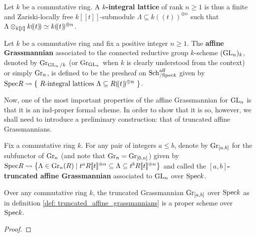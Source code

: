             \begin{definition} \label{def: integral_lattices}
                Let $k$ be a commutative ring. A \textbf{$k$-integral lattice} of rank $n \geq 1$ is thus a finite and Zariski-locally free $k[\![t]\!]$-submodule $\Lambda \subseteq k(\!(t)\!)^{\oplus n}$ such that $\Lambda \tensor_{k[\![t]\!]} k(\!(t)\!) \cong k(\!(t)\!)^{\oplus n}$. 
            \end{definition}
            \begin{definition} \label{def: the_affine_grassmannian_for_GLn}
                Let $k$ be a commutative ring and fix a positive integer $n \geq 1$. The \textbf{affine Grassmannian} associated to the connected reductive group $k$-scheme $(\operatorname{GL}_n)_k$, denoted by $\mathrm{Gr}_{\operatorname{GL}_n/k}$ (or $\mathrm{Gr}_{\operatorname{GL}_n}$ when $k$ is clearly understood from the context) or simply $\mathrm{Gr}_n$, is defined to be the presheaf on $\mathrm{Sch}_{/\mathrm{Spec} k}^{\mathrm{aff}}$ given by $\mathrm{Spec} R \leadsto \left\{ \text{ $R$-integral lattices $\Lambda \subseteq R(\!(t)\!)^{\oplus n}$ } \right\}$.
            \end{definition}
            Now, one of the most important properties of the affine Grassmannian for $\operatorname{GL}_n$ is that it is an ind-proper formal scheme. In order to show that it is so, however, we shall need to introduce a preliminary construction: that of truncated affine Grassmannians. 
            \begin{definition} \label{def: truncated_affine_grassmannians}
                Fix a commutative ring $k$. For any pair of integers $a \leq b$, denote by $\mathrm{Gr}_{[a, b]}$ for the subfunctor of $\mathrm{Gr}_n$ (and note that $\mathrm{Gr}_n = \mathrm{Gr}_{[0, n]}$) given by $\mathrm{Spec} R \leadsto \left\{ \Lambda \in \mathrm{Gr}_n(R) \mid t^a R[\![t]\!]^{\oplus n} \subseteq \Lambda \subseteq t^b R[\![t]\!]^{\oplus n} \right\}$ and called the \textbf{$[a, b]$-truncated affine Grassmannian} associated to $\operatorname{GL}_n$ over $\mathrm{Spec} k$.
            \end{definition}
            \begin{proposition} \label{prop: truncated_grassmannians_are_proper}
                Over any commutative ring $k$, the truncated Grassmannian $\mathrm{Gr}_{[a, b]}$ over $\mathrm{Spec} k$ as in definition \ref{def: truncated_affine_grassmannians} is a proper scheme over $\mathrm{Spec} k$.
            \end{proposition}
                \begin{proof}
                    
                \end{proof}
